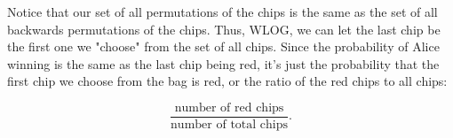 \documentclass[answers]{exam}
\begin{document}
\begin{questions}
\begin{parts}
\begin{solution}
Notice that our set of all permutations of the chips is the same as the
set of all backwards permutations of the chips. Thus, WLOG, we can let
the last chip be the first one we "choose" from the set of all chips. 
Since the probability of Alice winning is the same as the last chip
being red, it's just the probability that the first chip we choose from the
bag is red, or the ratio of the red chips to all chips:

\[
\frac{\text{number of red chips}}{\text{number of total chips}}
.\] 
\end{solution}
\end{parts}
\end{questions}
\end{document}
